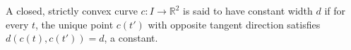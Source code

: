 A closed, strictly convex curve $c: I \to \mathbb{R}^2$ is said to have constant width $d$ if for every $t$, the unique point $c(t')$ with opposite tangent direction satisfies $d(c(t), c(t')) = d$, a constant.